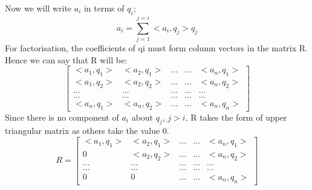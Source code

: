 \documentclass[12pt]{article}
\begin{document}
Now we will write $a_i$ in terms of $q_i$;
\begin{equation*}
    a_{i}=\sum_{j=1}^{j=i}<a_{i}, q_{j}>q_{j}
\end{equation*}
For factorisation, the coefficients of qi must form column vectors in the matrix R.\\
Hence we can say that R will be:
\begin{equation*}
    \left[\begin{array}{ccccc}
< a_{1}, q_{1}> & <a_{2}, q_{1}> & \ldots & \ldots & < a_{n}, q_{1}> \\
<a_{1}, q_{2}> & <a_{2}, q_{2}> & \ldots & \ldots & <a_{n}, q_{2}> \\
\ldots & \ldots & \ldots & \ldots & \ldots \\
\ldots & \ldots & \ldots & \ldots & \ldots \\
< a_{n}, q_{1}> & <a_{n}, q_{2}> & \ldots & \ldots & <a_{n}, q_{n}>
\end{array}\right]
\end{equation*}
Since there is no component of $a_i$ about $q_j$, $j>i$, R takes the form of upper triangular matrix as others take the value 0.
\begin{equation*}
    R=\left[\begin{array}{ccccc}
<a_{1}, q_{1}> & <a_{2}, q_{1}> & \ldots & \ldots & <a_{n}, q_{1}> \\
0 & <a_{2}, q_{2}> & \ldots & \ldots & <a_{n}, q_{2}> \\
\ldots & \ldots & \ldots & \ldots & \ldots \\
\ldots & \ldots & \ldots & \ldots & \ldots \\
0 & 0 & \ldots & \ldots & <a_{n}, q_{n}>
\end{array}\right]
\end{equation*}
\end{document}
